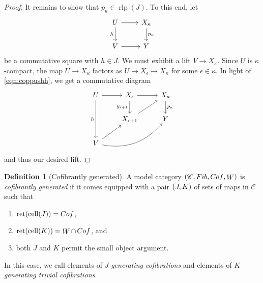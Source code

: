 \documentclass[10pt,letterpaper,cm]{nupset}
\theoremstyle{definition}
\newtheorem{definition}{Definition}[subsection]
\theoremstyle{theorem}
\theoremstyle{remark}
\newcommand{\0}{\mathbf{0}}
\newcommand{\1}{\mathbf{1}}
\newcommand{\2}{\mathbf{2}}
\renewcommand{\c}{\mathscr{C}}
\DeclareMathOperator{\fib}{\mathnormal{Fib}}
\DeclareMathOperator{\cof}{\mathnormal{Cof}}
\DeclareMathOperator{\we}{\mathnormal{W}}
\DeclareMathOperator{\cell}{cell}
\DeclareMathOperator{\ret}{ret}
\DeclareMathOperator{\rlp}{rlp}
\newcommand{\be}{\begin{enumerate}}
\newcommand{\ee}{\end{enumerate}}
\begin{document}
\begin{proof}
It remains to show that  $p_{\kappa} \in \rlp(J)$. To this end, let
\[
\begin{tikzcd}
U \arrow[d, "h"'] \arrow[r] & X_{\kappa} \arrow[d, "p_{\kappa}"] \\
V \arrow[r]                 & Y                                 
\end{tikzcd}
\] be a commutative square with $h\in J$. We must exhibit a lift $V\to X_{\kappa}$. Since $U$ is $\kappa$-compact, the map $U \to X_{\kappa}$ factors as $U \to X_{\epsilon} \to X_{\kappa}$ for some $\epsilon \in \kappa$. In light of \eqref{eqn:coppushh}, we get a commutative diagram
\[
\begin{tikzcd}
U \arrow[r] \arrow[dd, "h"']         & X_{\epsilon} \arrow[r] \arrow[d, "y_{\epsilon+1}"'] & X_{\kappa} \arrow[d, "p_{\kappa}"] \\
                                     & X_{\epsilon+1} \arrow[ru]                         & Y                                  \\
V \arrow[ru] \arrow[rru, bend right] &                                                   &                                   
\end{tikzcd}
\] and thus our desired lift.
\end{proof}

\pagebreak

\begin{definition}[Cofibrantly generated]\label{cofgen}
A model category $\mleft(\c, \fib, \cof, \we\mright)$ is \textit{cofibrantly generated} if it comes equipped with a pair $\mleft(J, K\mright)$ of sets of maps in $\c$ such that
\be[label=(\roman*)]
\item $\ret(\cell(J)) = \cof$,
\item $\ret(\cell(K)) = \we \cap \cof$, and
\item both $J$ and $K$ permit the small object argument.
\ee
In this case, we call elements of $J$ \textit{generating cofibrations} and elements of $K$ \textit{generating trivial cofibrations}.
\end{definition}
\end{document}
